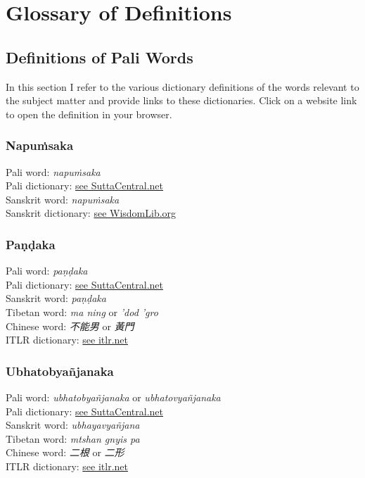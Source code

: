 \section{Glossary of Definitions}
\label{appendix3}

\subsection{Definitions of Pali Words}
In this section I refer to the various dictionary definitions of the words relevant to the subject matter and provide links to these dictionaries. Click on a website link to open the definition in your browser.
\bigskip

\subsubsection*{Napuṁsaka}

Pali word: {\em napuṁsaka}\\
Pali dictionary: \href{https://suttacentral.net/define/napu%E1%B9%83saka}{see SuttaCentral.net}\\
Sanskrit word: {\em napuṁsaka}\\
Sanskrit dictionary: \href{https://www.wisdomlib.org/definition/napumsaka}{see WisdomLib.org}
\bigskip

\subsubsection*{Paṇḍaka}

Pali word: {\em paṇḍaka}\\
Pali dictionary: \href{https://suttacentral.net/define/pa%E1%B9%87%E1%B8%8Daka}{see SuttaCentral.net}\\
Sanskrit word: {\em paṇḍaka}\\
Tibetan word: {\em ma ning} or {\em ’dod ’gro}\\
Chinese word: {\em 不能男} or {\em 黃門}\\
ITLR dictionary: \href{http://www.itlr.net/hwid:281142}{see itlr.net}
\bigskip

\subsubsection*{Ubhatob­yañ­janaka}

Pali word: {\em ubhatob­yañ­janaka} or {\em ubhatovyañ­janaka}\\
Pali dictionary: \href{https://suttacentral.net/define/ubhatovya%C3%B1janaka}{see SuttaCentral.net}\\
Sanskrit word: {\em ubhayavyañjana}\\
Tibetan word: {\em mtshan gnyis pa}\\
Chinese word: {\em 二根} or {\em 二形}\\
ITLR dictionary: \href{http://www.itlr.net/hwid:62844}{see itlr.net}
\bigskip

